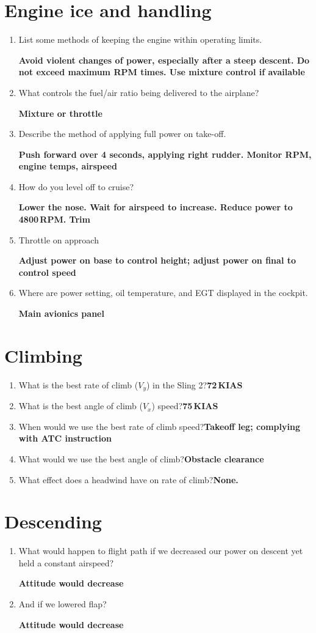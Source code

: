 \documentclass[11pt]{article}
\begin{document}
\section{Engine ice and handling}
\begin{enumerate}
	\item List some methods of keeping the engine within operating limits.

	\textbf{Avoid violent changes of power, especially after a steep descent. Do not exceed maximum RPM times. Use mixture control if available}
	\item What controls the fuel/air ratio being delivered to the airplane?

	\textbf{Mixture or throttle}
	\item Describe the method of applying full power on take-off.

	\textbf{Push forward over 4 seconds, applying right rudder. Monitor RPM, engine temps, airspeed}
	\item How do you level off to cruise?

	\textbf{Lower the nose. Wait for airspeed to increase. Reduce power to 4800\,RPM. Trim}
	\item Throttle on approach

	\textbf{Adjust power on base to control height; adjust power on final to control speed}
	\item Where are power setting, oil temperature, and EGT displayed in the cockpit. 

	\textbf{Main avionics panel}
\end{enumerate}
\section{Climbing}
\begin{enumerate}
	\item What is the best rate of climb (\(V_y\)) in the Sling 2?\hfill\textbf{72\,KIAS}
	\item What is the best angle of climb (\(V_x\)) speed?\hfill\textbf{75\,KIAS}
	\item When would we use the best rate of climb speed?\hfill\textbf{Takeoff leg; complying with ATC instruction}
	\item What would we use the best angle of climb?\hfill\textbf{Obstacle clearance}
	\item What effect does a headwind have on rate of climb?\hfill\textbf{None.}
\end{enumerate}
\section{Descending}
\begin{enumerate}
	\item What would happen to flight path if we decreased our power on descent yet held a constant airspeed?

	\textbf{Attitude would decrease}
	\item And if we lowered flap?

	\textbf{Attitude would decrease}
\end{enumerate}
\end{document}
